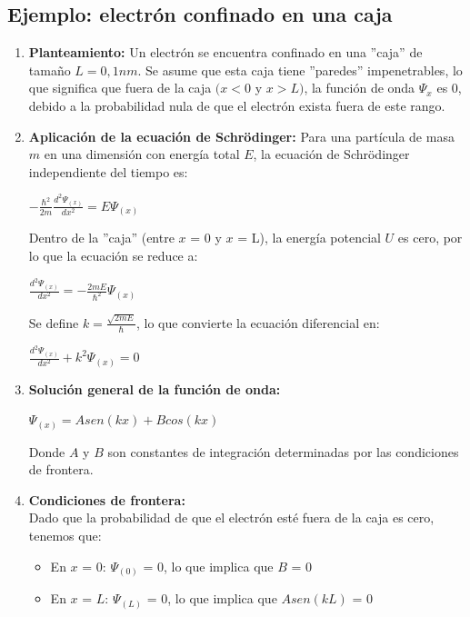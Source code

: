 \documentclass[a4paper]{article}
\begin{document}
	\subsection{Ejemplo: electrón confinado en una caja}
		\begin{enumerate}

			\item \indent \textbf{Planteamiento:} Un electrón se encuentra confinado en una ''caja'' de tamaño $L = 0,1nm$. Se asume que esta caja tiene ''paredes'' impenetrables, lo que significa que fuera de la caja $(x < 0$ y $x > L)$, la función de onda $\Psi_{x}$ es 0, debido a la probabilidad nula de que el electrón exista fuera de este rango. 

			\item \indent \textbf{Aplicación de la ecuación de Schrödinger:} Para una partícula de masa $m$ en una dimensión con energía total $E$, la ecuación de Schrödinger independiente del tiempo es:

				\saltoPag

				\begin{center}
					$- \frac{\hbar ^2}{2m} \frac{d^2 \Psi_{(x)}}{dx^2} = E \Psi_{(x)}$
				\end{center}

				Dentro de la ''caja'' (entre $x$ = 0 y $x$ = L), la energía potencial $U$ es cero, por lo que la ecuación se reduce a:

				\begin{center}
					$\frac{d^2 \Psi_{(x)}}{dx^2} = - \frac{2mE}{\hbar ^2} \Psi_{(x)}$
				\end{center}
				
				Se define $k = \frac{\sqrt{2mE}}{\hbar}$, lo que convierte la ecuación diferencial en:

				\begin{center}
					$\frac{d^2 \Psi_{(x)}}{dx^2} + k^2 \Psi_{(x)} = 0$
				\end{center}

			\item \indent \textbf{Solución general de la función de onda:} 

				\begin{center}
					$\Psi_{(x)} = Asen(kx) + Bcos(kx)$
				\end{center}

				Donde $A$ y $B$ son constantes de integración determinadas por las condiciones de frontera. \\

			\item \indent \textbf{Condiciones de frontera:} \\
				Dado que la probabilidad de que el electrón esté fuera de la caja es cero, tenemos que:
				\begin{itemize}
					\item En $x$ = 0: $\Psi_{(0)}$ = 0, lo que implica que $B$ = 0
					\item En $x$ = $L$: $\Psi_{(L)}$ = 0, lo que implica que $Asen(kL)$ = 0
				\end{itemize}


\end{enumerate}
\end{document}
